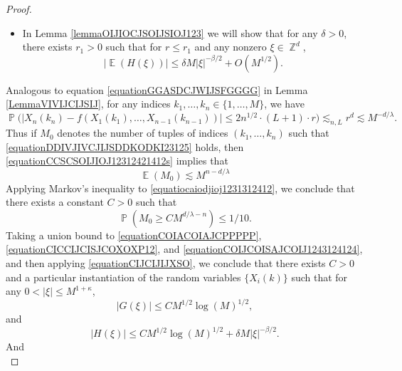 \documentclass[dvipsnames,letterpaper,12pt]{article}
\numberwithin{equation}{section}
\DeclareMathOperator{\ZZ}{\mathbb{Z}}
\numberwithin{theorem}{section}
\DeclareMathOperator{\EE}{\mathbb{E}}
\DeclareMathOperator{\PP}{\mathbb{P}}
\begin{document}
\begin{proof}
\begin{itemize}
        \item In Lemma \ref{lemmaOIJIOCJSOIJSIOJ123} we will show that for any $\delta > 0$, there exists $r_1 > 0$ such that for $r \leq r_1$ and any nonzero $\xi \in \ZZ^d$,
        \begin{equation} \label{equationCIJCIJIJXSO}
            |\EE(H(\xi))| \leq \delta M |\xi|^{-\beta/2} + O(M^{1/2}).
        \end{equation}
    \end{itemize}
    Analogous to equation \eqref{equationGGASDCJWIJSFGGGG} in Lemma \ref{LemmaVIVIJCIJSIJ}, for any indices $k_1,\dots,k_n \in \{ 1, \dots, M \}$, we have
    \begin{equation} \label{equationCCSCSOIJIOJ12312421412s}
        \PP \Big( |X_n(k_n) - f(X_1(k_1),\dots,X_{n-1}(k_{n-1}))| \leq 2 n^{1/2} \cdot (L+1) \cdot r \Big) \lesssim_{n,L} r^d \lesssim M^{-d/\lambda}.
    \end{equation}
    Thus if $M_0$ denotes the number of tuples of indices $(k_1,\dots,k_n)$ such that \eqref{equationDDIVJIVCJIJSDDKODKI23125} holds, then \eqref{equationCCSCSOIJIOJ12312421412s} implies that
    \begin{equation} \label{equatiocaiodjioj1231312412}
        \EE(M_0) \lesssim M^{n-d/\lambda}
    \end{equation}
    Applying Markov's inequality to \eqref{equatiocaiodjioj1231312412}, we conclude that there exists a constant $C > 0$ such that
    \begin{equation} \label{equationCOIJCOISAJCOIJ1243124124}
        \PP(M_0 \geq C M^{d/\lambda - n}) \leq 1/10.
    \end{equation}
    Taking a union bound to \eqref{equationCOIACOIAJCPPPPP}, \eqref{equationCICCIJCISJCOXOXP12}, and \eqref{equationCOIJCOISAJCOIJ1243124124}, and then applying \eqref{equationCIJCIJIJXSO}, we conclude that there exists $C > 0$ and a particular instantiation of the random variables $\{ X_i(k) \}$ such that for any $0 < |\xi| \leq M^{1 + \kappa}$,
    \begin{equation} \label{equatioACOINAWCOWANCOIWAN}
        |G(\xi)| \leq CM^{1/2} \log(M)^{1/2},
    \end{equation}
    and
    \begin{equation} \label{equatioNCOIJCOIJOIJO12312421412}
        |H(\xi)| \leq C M^{1/2} \log(M)^{1/2} + \delta M |\xi|^{-\beta/2}.
    \end{equation}
    And
    \begin{equation} \label{equationCOIACOIAWJOIJo21412412}

\end{equation}
\end{proof}
\end{document}
